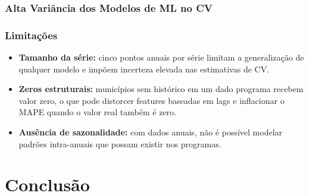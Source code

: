 \documentclass[12pt, a4paper]{article}
\begin{document}
\subsubsection{Alta Variância dos Modelos de ML no CV}


\subsubsection{Limitações}

\begin{itemize}[leftmargin=2cm]
  \item \textbf{Tamanho da série:} cinco pontos anuais por série limitam
        a generalização de qualquer modelo e impõem incerteza elevada nas
        estimativas de CV.
  \item \textbf{Zeros estruturais:} municípios sem histórico em um dado
        programa recebem valor zero, o que pode distorcer features baseadas
        em lags e inflacionar o MAPE quando o valor real também é zero.
  \item \textbf{Ausência de sazonalidade:} com dados anuais, não é
        possível modelar padrões intra-anuais que possam existir nos programas.
\end{itemize}

\newpage
\section{Conclusão}
\label{sec:conclusao}
\end{document}

